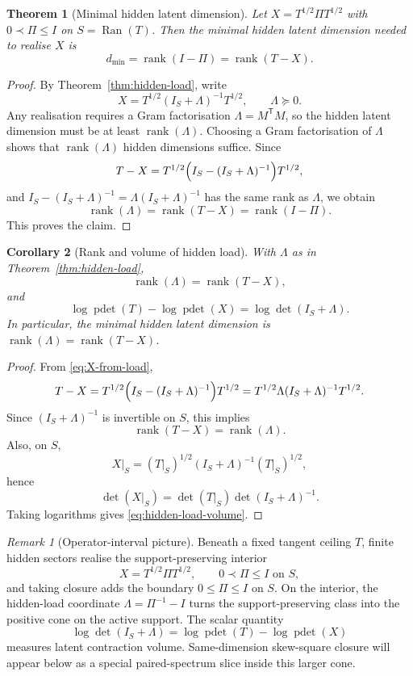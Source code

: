 \documentclass[11pt]{article}
\numberwithin{equation}{section}
\DeclareMathOperator{\rank}{rank}
\DeclareMathOperator{\pdet}{pdet}
\theoremstyle{thmcompact}
\newtheorem{theorem}{Theorem}[section]
\newtheorem{corollary}[theorem]{Corollary}
\theoremstyle{remark}
\newtheorem*{remarkplain}{Remark}
\newenvironment{remark}[1][]%
{\begin{remarkbox}\begin{remarkplain}[#1]\normalfont}
		{\end{remarkplain}\end{remarkbox}}
\begin{document}
\begin{theorem}[Minimal hidden latent dimension]\label{thm:min-hidden-dim}
Let $X=T^{1/2}\Pi T^{1/2}$ with $0\prec\Pi\le I$ on $S=\operatorname{Ran}(T)$. Then the minimal hidden latent dimension needed to realise $X$ is
\begin{equation}\label{eq:min-hidden-dim}
d_{\min} = \rank(I-\Pi) = \rank(T-X).
\end{equation}
\end{theorem}

\begin{proof}
By Theorem~\ref{thm:hidden-load}, write
\[
X=T^{1/2}(I_S+\Lambda)^{-1}T^{1/2},
\qquad
\Lambda\succeq 0.
\]
Any realisation requires a Gram factorisation $\Lambda=M^{\mathsf T}M$, so the hidden latent dimension must be at least $\rank(\Lambda)$. Choosing a Gram factorisation of $\Lambda$ shows that $\rank(\Lambda)$ hidden dimensions suffice. Since
\[
T-X = T^{1/2}\Bigl(I_S-(I_S+\Lambda)^{-1}\Bigr)T^{1/2},
\]
and $I_S-(I_S+\Lambda)^{-1}=\Lambda(I_S+\Lambda)^{-1}$ has the same rank as $\Lambda$, we obtain
\[
\rank(\Lambda)=\rank(T-X)=\rank(I-\Pi).
\]
This proves the claim.
\end{proof}

\begin{corollary}[Rank and volume of hidden load]\label{cor:hidden-load-rank-volume}
With $\Lambda$ as in Theorem~\ref{thm:hidden-load},
\begin{equation}\label{eq:hidden-load-rank}
\rank(\Lambda)=\rank(T-X),
\end{equation}
and
\begin{equation}\label{eq:hidden-load-volume}
\log\pdet(T)-\log\pdet(X)=\log\det(I_S+\Lambda).
\end{equation}
In particular, the minimal hidden latent dimension is $\rank(\Lambda)=\rank(T-X)$.
\end{corollary}

\begin{proof}
From \eqref{eq:X-from-load},
\[
T-X
=
T^{1/2}\Bigl(I_S-(I_S+\Lambda)^{-1}\Bigr)T^{1/2}
=
T^{1/2}\Lambda(I_S+\Lambda)^{-1}T^{1/2}.
\]
Since $(I_S+\Lambda)^{-1}$ is invertible on $S$, this implies
\[
\rank(T-X)=\rank(\Lambda).
\]
Also, on $S$,
\[
X|_S=(T|_S)^{1/2}(I_S+\Lambda)^{-1}(T|_S)^{1/2},
\]
hence
\[
\det(X|_S)=\det(T|_S)\det(I_S+\Lambda)^{-1}.
\]
Taking logarithms gives \eqref{eq:hidden-load-volume}.
\end{proof}

\begin{remark}[Operator-interval picture]
Beneath a fixed tangent ceiling $T$, finite hidden sectors realise the support-preserving interior
\[
X=T^{1/2}\Pi T^{1/2},
\qquad 0\prec \Pi\le I \text{ on } S,
\]
and taking closure adds the boundary $0\le \Pi\le I$ on $S$. On the interior, the hidden-load coordinate $\Lambda=\Pi^{-1}-I$ turns the support-preserving class into the positive cone on the active support. The scalar quantity
\[
\log\det(I_S+\Lambda)=\log\pdet(T)-\log\pdet(X)
\]
measures latent contraction volume. Same-dimension skew-square closure will appear below as a special paired-spectrum slice inside this larger cone.
\end{remark}
\end{document}
